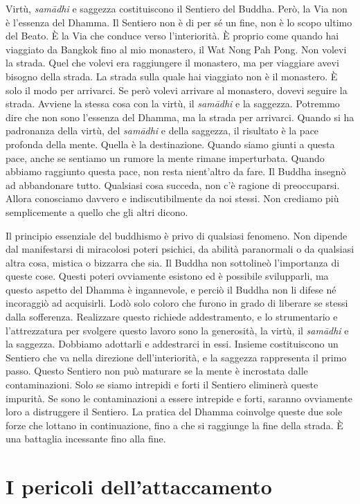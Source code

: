 Virtù, \emph{samādhi} e saggezza costituiscono il Sentiero del Buddha.
Però, la Via non è l'essenza del Dhamma. Il Sentiero non è di per sé un
fine, non è lo scopo ultimo del Beato. È la Via che conduce verso
l'interiorità. È proprio come quando hai viaggiato da Bangkok fino al
mio monastero, il Wat Nong Pah Pong. Non volevi la strada. Quel che
volevi era raggiungere il monastero, ma per viaggiare avevi bisogno
della strada. La strada sulla quale hai viaggiato non è il monastero. È
solo il modo per arrivarci. Se però volevi arrivare al monastero, dovevi
seguire la strada. Avviene la stessa cosa con la virtù, il
\emph{samādhi} e la saggezza. Potremmo dire che non sono l'essenza del
Dhamma, ma la strada per arrivarci. Quando si ha padronanza della virtù,
del \emph{samādhi} e della saggezza, il risultato è la pace profonda
della mente. Quella è la destinazione. Quando siamo giunti a questa
pace, anche se sentiamo un rumore la mente rimane imperturbata. Quando
abbiamo raggiunto questa pace, non resta nient'altro da fare. Il Buddha
insegnò ad abbandonare tutto. Qualsiasi cosa succeda, non c'è ragione di
preoccuparsi. Allora conosciamo davvero e indiscutibilmente da noi
stessi. Non crediamo più semplicemente a quello che gli altri dicono.

Il principio essenziale del buddhismo è privo di qualsiasi fenomeno. Non
dipende dal manifestarsi di miracolosi poteri psichici, da abilità
paranormali o da qualsiasi altra cosa, mistica o bizzarra che sia. Il
Buddha non sottolineò l'importanza di queste cose. Questi poteri
ovviamente esistono ed è possibile svilupparli, ma questo aspetto del
Dhamma è ingannevole, e perciò il Buddha non li difese né incoraggiò ad
acquisirli. Lodò solo coloro che furono in grado di liberare se stessi
dalla sofferenza. Realizzare questo richiede addestramento, e lo
strumentario e l'attrezzatura per svolgere questo lavoro sono la
generosità, la virtù, il \emph{samādhi} e la saggezza. Dobbiamo
adottarli e addestrarci in essi. Insieme costituiscono un Sentiero che
va nella direzione dell'interiorità, e la saggezza rappresenta il primo
passo. Questo Sentiero non può maturare se la mente è incrostata dalle
contaminazioni. Solo se siamo intrepidi e forti il Sentiero eliminerà
queste impurità. Se sono le contaminazioni a essere intrepide e forti,
saranno ovviamente loro a distruggere il Sentiero. La pratica del Dhamma
coinvolge queste due sole forze che lottano in continuazione, fino a che
si raggiunge la fine della strada. È una battaglia incessante fino alla
fine.

\section{I pericoli dell'attaccamento}

